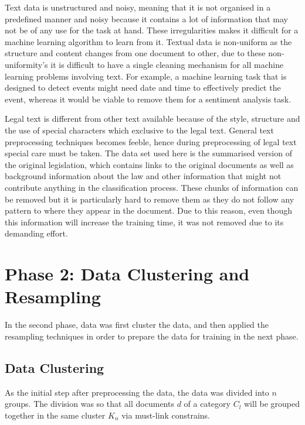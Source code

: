 Text data is unstructured and noisy, meaning that it is not organised in a predefined manner and noisy because it contains a lot of information that may not be of any use for the task at hand. These irregularities makes it difficult for a machine learning algorithm to learn from it. Textual data is non-uniform as the structure and content changes from one document to other, due to these non-uniformity's it is difficult to have a single cleaning mechanism for all machine learning problems involving text. For example, a machine learning task that is designed to detect events might need date and time to effectively predict the event, whereas it would be viable to remove them for a sentiment analysis task.

Legal text is different from other text available because of the style, structure \cite{boella2011using} and the use of special characters which exclusive to the legal text. General text preprocessing techniques becomes feeble, hence during preprocessing of legal text special care must be taken. The data set used here is the summarised version of the original legislation, which contains links to the original documents as well as background information about the law and other information that might not contribute anything in the classification process. These chunks of information can be removed but it is particularly hard to remove them as they do not follow any pattern to where they appear in the document. Due to this reason, even though this information will increase the training time, it was not removed due to its demanding effort.

\section{Phase 2: Data Clustering and Resampling}
In the second phase, data was first cluster the data, and then applied the resampling techniques in order to prepare the data for training in the next phase.
\subsection*{Data Clustering}
As the initial step after preprocessing the data, the data was divided into $n$ groups. The division was so that all documents $d$ of a category $C_{l}$ will be grouped together in the same cluster $K_{n}$ via must-link constrains.


